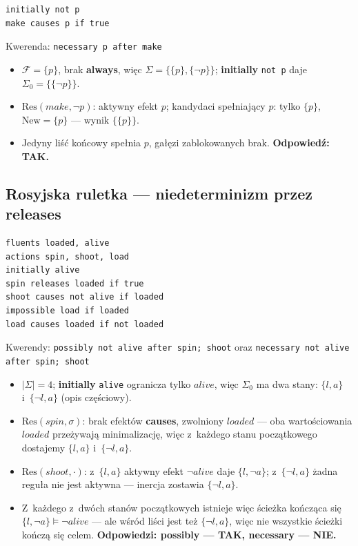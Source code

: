 \documentclass[11pt,a4paper]{article}
\newcommand{\Res}{\mathrm{Res}}
\newcommand{\New}{\mathrm{New}}
\begin{document}
\begin{verbatim}
initially not p
make causes p if true
\end{verbatim}
Kwerenda: \texttt{necessary p after make}

\begin{itemize}
  \item $\mathcal{F}=\{p\}$, brak \textbf{always}, więc
        $\Sigma = \{\{p\},\{\lnot p\}\}$; \textbf{initially} \texttt{not p} daje
        $\Sigma_0 = \{\{\lnot p\}\}$.
  \item $\Res(\mathit{make}, \lnot p)$: aktywny efekt $p$; kandydaci spełniający
        $p$: tylko $\{p\}$, $\New = \{p\}$ --- wynik $\{\{p\}\}$.
  \item Jedyny liść końcowy spełnia $p$, gałęzi zablokowanych brak.
        \textbf{Odpowiedź: TAK.}
\end{itemize}

\subsection{Rosyjska ruletka --- niedeterminizm przez \textbf{releases}}

\begin{verbatim}
fluents loaded, alive
actions spin, shoot, load
initially alive
spin releases loaded if true
shoot causes not alive if loaded
impossible load if loaded
load causes loaded if not loaded
\end{verbatim}
Kwerendy: \texttt{possibly not alive after spin; shoot} \quad oraz \quad
\texttt{necessary not alive after spin; shoot}

\begin{itemize}
  \item $|\Sigma| = 4$; \textbf{initially} \texttt{alive} ogranicza tylko
        $\mathit{alive}$, więc $\Sigma_0$ ma dwa stany:
        $\{l, a\}$ i~$\{\lnot l, a\}$ (opis częściowy).
  \item $\Res(\mathit{spin},\sigma)$: brak efektów \textbf{causes}, zwolniony
        $\mathit{loaded}$ --- oba wartościowania $\mathit{loaded}$ przeżywają
        minimalizację, więc z~każdego stanu początkowego dostajemy
        $\{l,a\}$ i~$\{\lnot l,a\}$.
  \item $\Res(\mathit{shoot},\cdot)$: z~$\{l,a\}$ aktywny efekt
        $\lnot\mathit{alive}$ daje $\{l,\lnot a\}$; z~$\{\lnot l,a\}$ żadna
        reguła nie jest aktywna --- inercja zostawia $\{\lnot l,a\}$.
  \item Z~każdego z~dwóch stanów początkowych istnieje więc ścieżka kończąca
        się $\{l,\lnot a\} \models \lnot\mathit{alive}$ --- ale wśród liści jest
        też $\{\lnot l, a\}$, więc nie wszystkie ścieżki kończą się celem.
        \textbf{Odpowiedzi: possibly --- TAK, necessary --- NIE.}
\end{itemize}
\end{document}
